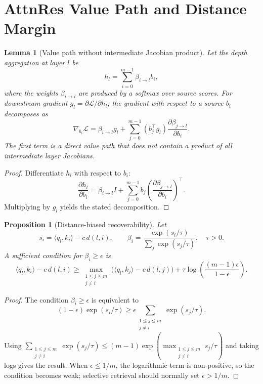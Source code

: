 \documentclass[11pt]{article}
\newtheorem{lemma}[theorem]{Lemma}
\newtheorem{proposition}[theorem]{Proposition}
\begin{document}
\section{AttnRes Value Path and Distance Margin}
\label{app:attnres-margin}

\begin{lemma}[Value path without intermediate Jacobian product]
Let the depth aggregation at layer $l$ be
\begin{equation}
h_l=\sum_{i=0}^{m-1}\beta_{i\to l}b_i,
\end{equation}
where the weights $\beta_{i\to l}$ are produced by a softmax over source scores. For downstream gradient $g_l=\partial \mathcal{L}/\partial h_l$, the gradient with respect to a source $b_i$ decomposes as
\begin{equation}
\nabla_{b_i}\mathcal{L}
=\beta_{i\to l}g_l + \sum_{j=0}^{m-1}(b_j^\top g_l)\frac{\partial \beta_{j\to l}}{\partial b_i}.
\end{equation}
The first term is a direct value path that does not contain a product of all intermediate layer Jacobians.
\end{lemma}

\begin{proof}
Differentiate $h_l$ with respect to $b_i$:
\begin{equation}
\frac{\partial h_l}{\partial b_i}
= \beta_{i\to l}I + \sum_{j=0}^{m-1} b_j\left(\frac{\partial \beta_{j\to l}}{\partial b_i}\right)^\top.
\end{equation}
Multiplying by $g_l$ yields the stated decomposition.
\end{proof}

\begin{proposition}[Distance-biased recoverability]
\label{prop:attnres-margin}
Let
\begin{equation}
s_i=\langle q_l,k_i\rangle-c\,d(l,i),\qquad
\beta_i=\frac{\exp(s_i/\tau)}{\sum_{j}\exp(s_j/\tau)},\quad \tau>0.
\end{equation}
A sufficient condition for $\beta_i\geq\epsilon$ is
\begin{equation}
\langle q_l,k_i\rangle-c\,d(l,i)
\geq
\max_{\substack{1\le j\le m\\ j\ne i}}\big(\langle q_l,k_j\rangle-c\,d(l,j)\big)
+\tau\log\left(\frac{(m-1)\epsilon}{1-\epsilon}\right).
\end{equation}
\end{proposition}

\begin{proof}
The condition $\beta_i\geq\epsilon$ is equivalent to
\begin{equation}
(1-\epsilon)\exp(s_i/\tau)\geq \epsilon\sum_{\substack{1\le j\le m\\ j\ne i}}\exp(s_j/\tau).
\end{equation}
Using $\sum_{\substack{1\le j\le m\\ j\ne i}}\exp(s_j/\tau)\leq (m-1)\exp(\max_{\substack{1\le j\le m\\ j\ne i}}s_j/\tau)$ and taking logs gives the result. When $\epsilon\leq 1/m$, the logarithmic term is non-positive, so the condition becomes weak; selective retrieval should normally set $\epsilon>1/m$.
\end{proof}
\end{document}

